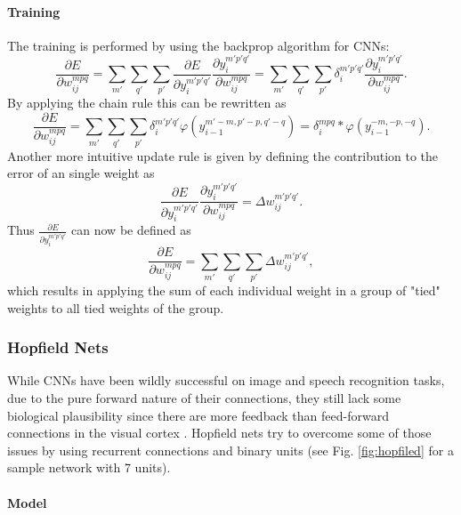\paragraph{Training} \label{c:cnntraining}


The training is performed by using the backprop algorithm for CNNs:
\[
\frac{\partial E}{\partial w_{ij}^{mpq}} = \sum_{m'} \sum_ {q'}  \sum_{p'} \frac{\partial E}{\partial y_i^{m' p' q'}}  \frac{\partial y_i^{m' p' q'}}{\partial w_{ij}^{mpq}}  = \sum_{m'} \sum_ {q'}  \sum_{p'} \delta_i^{m' p' q'}  \frac{\partial y_i^{m' p' q'}}{\partial w_{ij}^{mpq}}.
\] 
By applying the chain rule this can be rewritten as
\[
\frac{\partial E}{\partial w_{ij}^{mpq}} = \sum_{m'} \sum_ {q'}  \sum_{p'} \delta_i^{m' p' q'}  \varphi(y_{i-1}^{m'-m, p'-p, q'-q}) = \delta_i^{m p q}  * \varphi(y_{i-1}^{-m, -p, -q}).
\] 
Another more intuitive update rule is given by defining the contribution to the error of an single weight as
\[
\frac{\partial E}{\partial y_i^{m' p' q'}}  \frac{\partial y_i^{m' p' q'}}{\partial w_{ij}^{mpq}}  = \Delta w_{ij}^{m' p' q'}.
\] 
Thus $\frac{\partial E}{\partial y_i^{m' p' q'}}$ can now be defined as
\[
\frac{\partial E}{\partial w_{ij}^{mpq}} = \sum_{m'} \sum_ {q'}  \sum_{p'} \Delta w_{ij}^{m' p' q'},
\] 
which results in applying the sum of each individual weight in a group of "tied" weights to all tied weights of the group.



\subsubsection{Hopfield Nets} \label{c:hopnets}

While CNNs have been wildly successful on image and speech recognition tasks, due to the pure forward nature of their connections, they still lack some biological plausibility since there are more feedback than feed-forward connections in the visual cortex \cite{sillito2006always}.
Hopfield nets try to overcome some of those issues by using recurrent connections and binary units \cite{Goodfellow-et-al-2016-Book}\cite{hopfield1982neural} (see Fig. \ref{fig:hopfiled} for a sample network with 7 units).

\paragraph{Model} \label{c:hopmodel}

